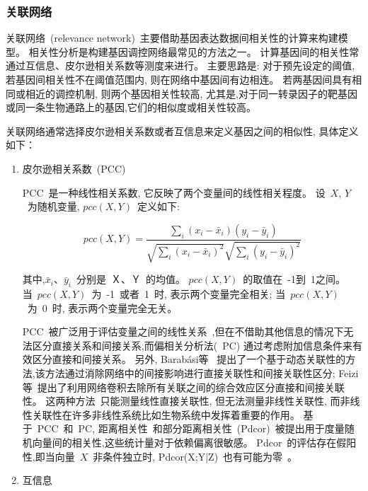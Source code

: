 \subsubsection{关联网络}
关联网络~(relevance network)~主要借助基因表达数据间相关性的计算来构建模型。
相关性分析是构建基因调控网络最常见的方法之一。
计算基因间的相关性常通过互信息、皮尔逊相关系数等测度来进行。
主要思路是: 对于预先设定的阈值, 若基因间相关性不在阈值范围内, 则在网络中基因间有边相连。
若两基因间具有相同或相近的调控机制, 则两个基因相关性较高,
尤其是,对于同一转录因子的靶基因或同一条生物通路上的基因,它们的相似度或相关性较高。

关联网络通常选择皮尔逊相关系数或者互信息来定义基因之间的相似性, 具体定义如下：
\begin{enumerate}
\item 
皮尔逊相关系数~(PCC)

PCC~是一种线性相关系数, 它反映了两个变量间的线性相关程度。
设~$X$, $Y$~为随机变量, $pcc(X,Y)$~定义如下:

\begin{equation}
pcc(X,Y) = \frac{{\sum\limits_i {(x_i -\bar x_i )(y_i -\bar y_i )} }}{{\sqrt {\sum\limits_i {(x_i  - \bar x_i )^2 } } \sqrt {\sum\limits_i {(y_i  - \bar y_i )^2 } } }}
\end{equation}

其中,$\bar x_i$、$\bar y_i$~分别是~Ｘ、Ｙ~的均值。
$pcc(X,Y)$~的取值在~-1到~1之间。
当~$pcc(X,Y)$~为~-1~或者~1~时, 表示两个变量完全相关;
当~$pcc(X,Y)$~为~0~时, 表示两个变量完全无关。

PCC~被广泛用于评估变量之间的线性关系~\cite{stuart2003gene},但在不借助其他信息的情况下无法区分直接关系和间接关系,而偏相关分析法(~PC) \cite{baba2004partial}通过考虑附加信息条件来有效区分直接和间接关系。
另外, Barabási等~\cite{barzel2013network} 提出了一个基于动态关联性的方法,该方法通过消除网络中的间接影响进行直接关联性和间接关联性区分; 
Feizi等~\cite{feizi2013network}提出了利用网络卷积去除所有关联之间的综合效应区分直接和间接关联性。
这两种方法~\cite{barzel2013network,feizi2013network}只能测量线性直接关联性,
但无法测量非线性关联性, 而非线性关联性在许多非线性系统比如生物系统中发挥着重要的作用。
基于~PCC~和~PC, 距离相关性~\cite{szekely2007measuring,kosorok2009brownian}和部分距离相关性~(Pdcor)~\cite{szekely2014partial}被提出用于度量随机向量间的相关性,这些统计量对于依赖偏离很敏感。
Pdcor~的评估存在假阳性,即当向量~$X$~非条件独立时, Pdcor(X;Y|Z)~也有可能为零~\cite{szekely2014partial}。

\item 
互信息


\end{enumerate}
